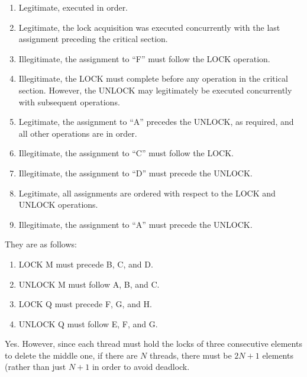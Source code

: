 
	\begin{enumerate}
	\item	Legitimate, executed in order.
	\item	Legitimate, the lock acquisition was executed concurrently
		with the last assignment preceding the critical section.
	\item	Illegitimate, the assignment to ``F'' must follow the LOCK
		operation.
	\item	Illegitimate, the LOCK must complete before any operation in
		the critical section.  However, the UNLOCK may legitimately
		be executed concurrently with subsequent operations.
	\item	Legitimate, the assignment to ``A'' precedes the UNLOCK,
		as required, and all other operations are in order.
	\item	Illegitimate, the assignment to ``C'' must follow the LOCK.
	\item	Illegitimate, the assignment to ``D'' must precede the UNLOCK.
	\item	Legitimate, all assignments are ordered with respect to the
		LOCK and UNLOCK operations.
	\item	Illegitimate, the assignment to ``A'' must precede the UNLOCK.
	\end{enumerate}


	They are as follows:
	\begin{enumerate}
	\item	LOCK M must precede B, C, and D.
	\item	UNLOCK M must follow A, B, and C.
	\item	LOCK Q must precede F, G, and H.
	\item	UNLOCK Q must follow E, F, and G.
	\end{enumerate}


	Yes.
	However, since each thread must hold the locks of three
	consecutive elements to delete the middle one, if there
	are $N$ threads, there must be $2N+1$ elements (rather than
	just $N+1$ in order to avoid deadlock.

